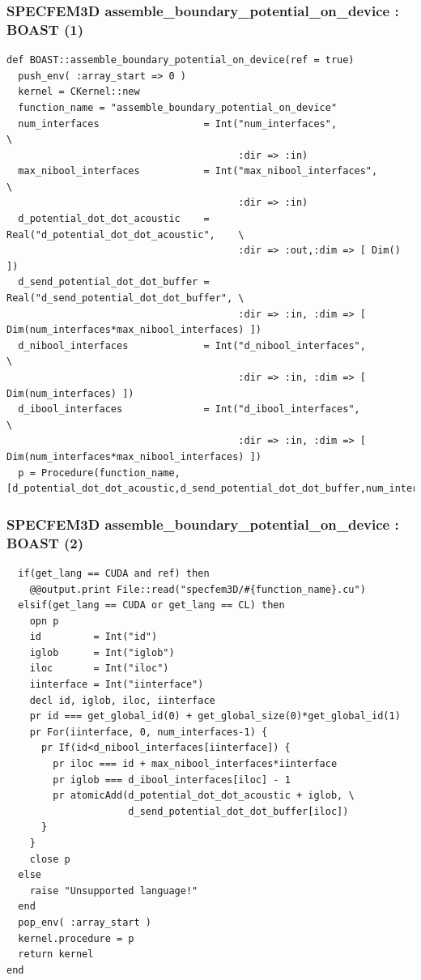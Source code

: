 \documentclass{beamer}
\begin{document}
\begin{frame}[fragile]
\frametitle{SPECFEM3D assemble\_boundary\_potential\_on\_device : BOAST (1)}
\lstset{style=BOAST}
\tiny
\begin{lstlisting}
def BOAST::assemble_boundary_potential_on_device(ref = true)
  push_env( :array_start => 0 )
  kernel = CKernel::new
  function_name = "assemble_boundary_potential_on_device"
  num_interfaces                  = Int("num_interfaces",                   \
                                        :dir => :in)
  max_nibool_interfaces           = Int("max_nibool_interfaces",            \
                                        :dir => :in)
  d_potential_dot_dot_acoustic    = Real("d_potential_dot_dot_acoustic",    \
                                        :dir => :out,:dim => [ Dim() ])
  d_send_potential_dot_dot_buffer = Real("d_send_potential_dot_dot_buffer", \
                                        :dir => :in, :dim => [ Dim(num_interfaces*max_nibool_interfaces) ])
  d_nibool_interfaces             = Int("d_nibool_interfaces",              \
                                        :dir => :in, :dim => [ Dim(num_interfaces) ])
  d_ibool_interfaces              = Int("d_ibool_interfaces",               \
                                        :dir => :in, :dim => [ Dim(num_interfaces*max_nibool_interfaces) ])
  p = Procedure(function_name, [d_potential_dot_dot_acoustic,d_send_potential_dot_dot_buffer,num_interfaces,max_nibool_interfaces,d_nibool_interfaces,d_ibool_interfaces])
\end{lstlisting}

\end{frame}

\begin{frame}[fragile]
\frametitle{SPECFEM3D assemble\_boundary\_potential\_on\_device : BOAST (2)}
\lstset{style=BOAST}
\tiny
\begin{lstlisting}
  if(get_lang == CUDA and ref) then
    @@output.print File::read("specfem3D/#{function_name}.cu")
  elsif(get_lang == CUDA or get_lang == CL) then
    opn p
    id         = Int("id")
    iglob      = Int("iglob")
    iloc       = Int("iloc")
    iinterface = Int("iinterface")
    decl id, iglob, iloc, iinterface
    pr id === get_global_id(0) + get_global_size(0)*get_global_id(1)
    pr For(iinterface, 0, num_interfaces-1) {
      pr If(id<d_nibool_interfaces[iinterface]) {
        pr iloc === id + max_nibool_interfaces*iinterface
        pr iglob === d_ibool_interfaces[iloc] - 1
        pr atomicAdd(d_potential_dot_dot_acoustic + iglob, \
                     d_send_potential_dot_dot_buffer[iloc])
      }
    }
    close p
  else
    raise "Unsupported language!"
  end
  pop_env( :array_start )
  kernel.procedure = p
  return kernel
end
\end{lstlisting}

\end{frame}
\end{document}
